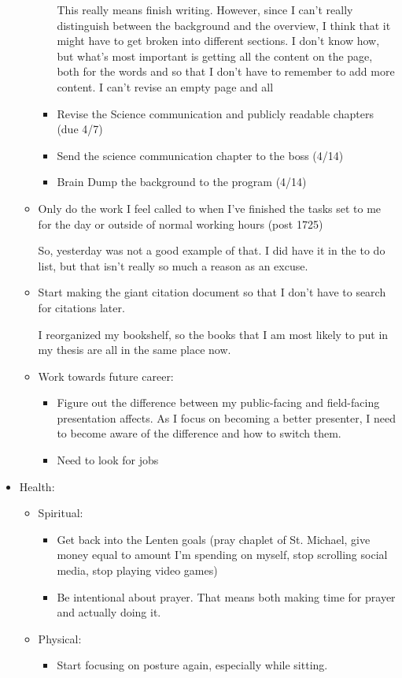 \documentclass[12pt]{article}[titlepage]
\renewcommand{\,}{\textsuperscript{,}}
\begin{document}
\begin{itemize}
\begin{itemize}
\begin{itemize}
This really means finish writing.  
However, since I can't really distinguish between the background and the overview, I think that it might have to get broken into different sections.  
I don't know how, but what's most important is getting all the content on the page, both for the words and so that I don't have to remember to add more content.  
I can't revise an empty page and all  
\item Revise the Science communication and publicly readable chapters (due 4/7)  
\item Send the science communication chapter to the boss (4/14)  
\item Brain Dump the background to the program (4/14)  
\end{itemize}  
\item Only do the work I feel called to when I've finished the tasks set to me for the day or outside of normal working hours (post 1725)

So, yesterday was not a good example of that.  
I did have it in the to do list, but that isn't really so much a reason as an excuse.  
\item Start making the giant citation document so that I don't have to search for citations later.

I reorganized my bookshelf, so the books that I am most likely to put in my thesis are all in the same place now.  
\item Work towards future career:   
\begin{itemize}   
\item Figure out the difference between my public-facing and field-facing presentation affects. As I focus on becoming a better presenter, I need to become aware of the difference and how to switch them.  
\item Need to look for jobs  
\end{itemize}   
\end{itemize}   
\item Health:  
\begin{itemize}   
\item Spiritual:   
\begin{itemize}   
\item Get back into the Lenten goals (pray chaplet of St. Michael, give money equal to amount I'm spending on myself, stop scrolling social media, stop playing video games)  
\item Be intentional about prayer. That means both making time for prayer and actually doing it.  
\end{itemize}   
\item Physical:   
\begin{itemize}   
\item Start focusing on posture again, especially while sitting.


\end{itemize}
\end{itemize}
\end{itemize}
\end{document}
